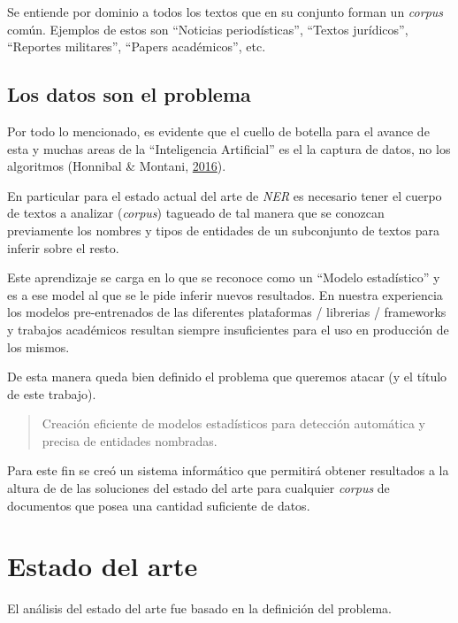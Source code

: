 \documentclass[12pt,a4paper,]{scrartcl}
\begin{document}
Se entiende por dominio a todos los textos que en su conjunto forman un \emph{corpus} común. Ejemplos de estos son \enquote{Noticias periodísticas}, \enquote{Textos jurídicos}, \enquote{Reportes militares}, \enquote{Papers académicos}, etc.

\hypertarget{los-datos-son-el-problema}{%
\subsection{Los datos son el problema}\label{los-datos-son-el-problema}}

Por todo lo mencionado, es evidente que el cuello de botella para el avance de esta y muchas areas de la \enquote{Inteligencia Artificial} es el la captura de datos, no los algoritmos (Honnibal \& Montani, \protect\hyperlink{ref-montani_AI}{2016}).

En particular para el estado actual del arte de \emph{NER} es necesario tener el cuerpo de textos a analizar (\emph{corpus}) tagueado de tal manera que se conozcan previamente los nombres y tipos de entidades de un subconjunto de textos para inferir sobre el resto.

Este aprendizaje se carga en lo que se reconoce como un \enquote{Modelo estadístico} y es a ese model al que se le pide inferir nuevos resultados. En nuestra experiencia los modelos pre-entrenados de las diferentes plataformas / librerias / frameworks y trabajos académicos resultan siempre insuficientes para el uso en producción de los mismos.

De esta manera queda bien definido el problema que queremos atacar (y el título de este trabajo).

\begin{quote}
Creación eficiente de modelos estadísticos para detección automática y precisa de entidades nombradas.
\end{quote}

Para este fin se creó un sistema informático que permitirá obtener resultados a la altura de de las soluciones del estado del arte para cualquier \emph{corpus} de documentos que posea una cantidad suficiente de datos.

\newpage

\hypertarget{state-of-art}{%
\section{Estado del arte}\label{state-of-art}}

El análisis del estado del arte fue basado en la definición del problema.
\end{document}
